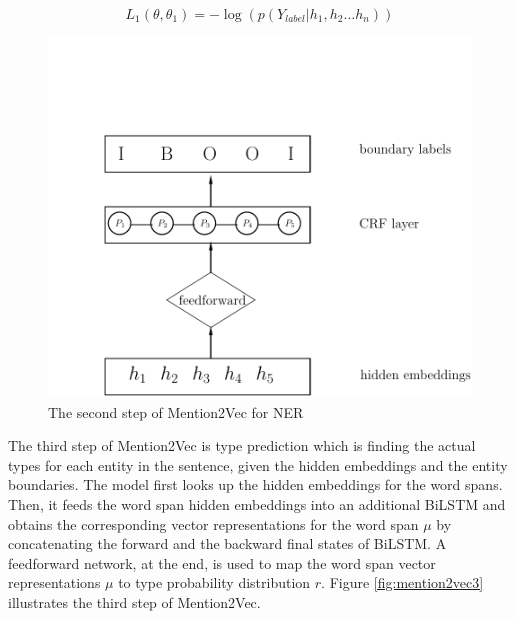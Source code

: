 \documentclass{sfuthesis}
\begin{document}
\begin{equation}\label{eqn:loss1}
  L_{1}\left( \theta ,\theta _{1}\right) =-\log \left( p\left( Y_{label}|h_{1}, h_{2} \dots h_{n}\right) \right) 
\end{equation}

\begin{figure}
  \centering
  \includegraphics[scale=0.6]{mention2vec2.pdf}
 \caption{The second step of Mention2Vec for NER}
  \label{fig:mention2vec2}
\end{figure}

The third step of Mention2Vec is type prediction which is finding the actual types for each entity in the sentence, given the hidden embeddings and the entity boundaries. The model first looks up the hidden embeddings for the word spans. Then, it feeds the word span hidden embeddings into an additional BiLSTM and obtains the corresponding vector representations for the word span $\mu$ by concatenating the forward and the backward final states of BiLSTM. A feedforward network, at the end, is used to map the word span vector representations $\mu$ to type probability distribution $r$. Figure \ref{fig:mention2vec3} illustrates the third step of Mention2Vec.
\end{document}
